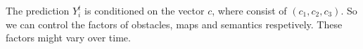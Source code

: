 \documentclass[sigconf]{acmart}
\begin{document}
The prediction $Y_i^t$ is conditioned on the vector $c$, where consist of $(c_1, c_2, c_3)$. So we can control the factors of obstacles, maps and semantics respetively. These factors might vary over time.







\end{document}
